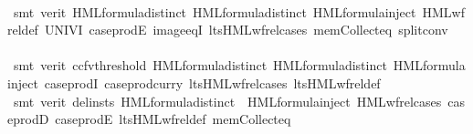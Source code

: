\begin{isabellebody}
\ \ \ \ \isamarkupfalse%
\ {\isacharparenleft}{\kern0pt}smt\ {\isacharparenleft}{\kern0pt}verit{\isacharparenright}{\kern0pt}\ HML{\isacharunderscore}{\kern0pt}formula{\isachardot}{\kern0pt}distinct{\isacharparenleft}{\kern0pt}{}{}{\isacharparenright}{\kern0pt}\ HML{\isacharunderscore}{\kern0pt}formula{\isachardot}{\kern0pt}distinct{\isacharparenleft}{\kern0pt}{}{\isacharparenright}{\kern0pt}\ HML{\isacharunderscore}{\kern0pt}formula{\isachardot}{\kern0pt}inject{\isacharparenleft}{\kern0pt}{}{\isacharparenright}{\kern0pt}\ HML{\isacharunderscore}{\kern0pt}wf{\isacharunderscore}{\kern0pt}rel{\isacharunderscore}{\kern0pt}def\ UNIV{\isacharunderscore}{\kern0pt}I\ case{\isacharunderscore}{\kern0pt}prodE{\isacharprime}{\kern0pt}\ image{\isacharunderscore}{\kern0pt}eqI\ lts{\isachardot}{\kern0pt}HML{\isacharunderscore}{\kern0pt}wf{\isacharunderscore}{\kern0pt}rel{\isachardot}{\kern0pt}cases\ mem{\isacharunderscore}{\kern0pt}Collect{\isacharunderscore}{\kern0pt}eq\ split{\isacharunderscore}{\kern0pt}conv{\isacharparenright}{\kern0pt}\isanewline
\ \ \ \ \isamarkupfalse%
\ {\isacharparenleft}{\kern0pt}smt\ {\isacharparenleft}{\kern0pt}verit{\isacharcomma}{\kern0pt}\ ccfv{\isacharunderscore}{\kern0pt}threshold{\isacharparenright}{\kern0pt}\ HML{\isacharunderscore}{\kern0pt}formula{\isachardot}{\kern0pt}distinct{\isacharparenleft}{\kern0pt}{}{}{\isacharparenright}{\kern0pt}\ HML{\isacharunderscore}{\kern0pt}formula{\isachardot}{\kern0pt}distinct{\isacharparenleft}{\kern0pt}{}{\isacharparenright}{\kern0pt}\ HML{\isacharunderscore}{\kern0pt}formula{\isachardot}{\kern0pt}inject{\isacharparenleft}{\kern0pt}{}{\isacharparenright}{\kern0pt}\ case{\isacharunderscore}{\kern0pt}prodI{}\ case{\isacharunderscore}{\kern0pt}prod{\isacharunderscore}{\kern0pt}curry\ lts{\isachardot}{\kern0pt}HML{\isacharunderscore}{\kern0pt}wf{\isacharunderscore}{\kern0pt}rel{\isachardot}{\kern0pt}cases\ lts{\isachardot}{\kern0pt}HML{\isacharunderscore}{\kern0pt}wf{\isacharunderscore}{\kern0pt}rel{\isacharunderscore}{\kern0pt}def{\isacharparenright}{\kern0pt}\isanewline
\ \ \ \ \isamarkupfalse%
\ {\isacharparenleft}{\kern0pt}smt\ {\isacharparenleft}{\kern0pt}verit{\isacharcomma}{\kern0pt}\ del{\isacharunderscore}{\kern0pt}insts{\isacharparenright}{\kern0pt}\ HML{\isacharunderscore}{\kern0pt}formula{\isachardot}{\kern0pt}distinct{\isacharparenleft}{\kern0pt}{}{\isacharcomma}{\kern0pt}{}{\isacharcomma}{\kern0pt}{}{\isacharcomma}{\kern0pt}{}{}{\isacharparenright}{\kern0pt}\ \ HML{\isacharunderscore}{\kern0pt}formula{\isachardot}{\kern0pt}inject{\isacharparenleft}{\kern0pt}{}{\isacharparenright}{\kern0pt}\ HML{\isacharunderscore}{\kern0pt}wf{\isacharunderscore}{\kern0pt}rel{\isachardot}{\kern0pt}cases\ case{\isacharunderscore}{\kern0pt}prodD\ case{\isacharunderscore}{\kern0pt}prodE{\isacharprime}{\kern0pt}\ lts{\isachardot}{\kern0pt}HML{\isacharunderscore}{\kern0pt}wf{\isacharunderscore}{\kern0pt}rel{\isacharunderscore}{\kern0pt}def\ mem{\isacharunderscore}{\kern0pt}Collect{\isacharunderscore}{\kern0pt}eq{\isacharparenright}{\kern0pt}\isanewline

\end{isabellebody}
